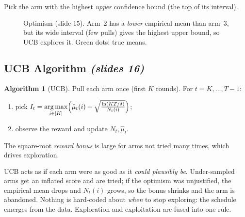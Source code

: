 \documentclass[11pt,a4paper]{article}
\DeclareMathOperator*{\argmax}{arg\,max}
\newcommand{\slides}[1]{\emph{(slides #1)}}
\theoremstyle{plain}
\theoremstyle{definition}
\newtheorem{algorithm}[theorem]{Algorithm}
\theoremstyle{remark}
\begin{document}
Pick the arm with the highest \emph{upper} confidence bound (the top of its interval).

\begin{figure}[ht]
\centering
{}
\caption{Optimism (slide 15). Arm~2 has a \emph{lower} empirical mean than arm~3, but its wide interval (few pulls) gives the highest upper bound, so UCB explores it.
Green dots: true means.}
\end{figure}

\subsection{UCB Algorithm \slides{16}}

\begin{algorithm}[UCB]\label{alg:ucb}
Pull each arm once (first $K$ rounds). For $t=K,\dots,T-1$:
\begin{enumerate}
  \item pick $\displaystyle I_t=\argmax_{i\in[K]}\Bigl(\hat\mu_t(i)+\sqrt{\tfrac{\ln(KT/\delta)}{N_t(i)}}\Bigr)$;
  \item observe the reward and update $N_t,\hat\mu_t$.
\end{enumerate}
The square-root \emph{reward bonus} is large for arms not tried many times, which drives exploration.
\end{algorithm}

\begin{intuition}
UCB acts as if each arm were as good as it \emph{could plausibly be}. Under-sampled arms get an inflated score and are tried;
if the optimism was unjustified, the empirical mean drops and $N_t(i)$ grows, so the bonus shrinks and the arm is abandoned.
Nothing is hard-coded about \emph{when} to stop exploring: the schedule emerges from the data. Exploration and exploitation are fused into one rule.
\end{intuition}
\end{document}
